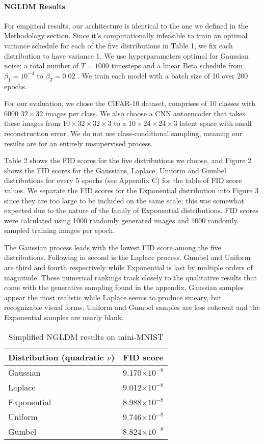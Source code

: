 \documentclass[10pt,twocolumn,letterpaper]{article}
\begin{document}
\paragraph{\textbf{NGLDM Results}} For empirical results, our architecture is identical to the one we defined in the Methodology section. Since it's computationally infeasible to train an optimal variance schedule for each of the five distributions in Table 1, we fix each distribution to have variance 1. We use hyperparameters optimal for Gaussian noise: a total number of $T=1000$ timesteps and a linear Beta schedule from $\beta_1=10^{-4}$ to $\beta_T=0.02$ \cite{DBLP:journals/corr/abs-2006-11239}. We train each model with a batch size of 10 over 200 epochs.

For our evaluation, we chose the CIFAR-10 dataset, comprises of 10 classes with 6000 $32\times 32$ images per class. We also choose a CNN autoencoder that takes these images from $10\times 32\times 32\times 3$ to a $10\times 24\times 24\times 3$ latent space with small reconstruction error. We do not use class-conditional sampling, meaning our results are for an entirely unsupervised process.

Table 2 shows the FID scores for the five distributions we choose, and Figure 2 shows the FID scores for the Gaussians, Laplace, Uniform and Gumbel distributions for every 5 epochs (see Appendix C) for the table of FID score values. We separate the FID scores for the Exponential distribution into Figure 3 since they are too large to be included on the same scale; this was somewhat expected due to the nature of the family of Exponential distributions. FID scores were calculated using 1000 randomly generated images and 1000 randomly sampled training images per epoch.

The Gaussian process leads with the lowest FID score among the five distributions. Following in second is the Laplace process. Gumbel and Uniform are third and fourth respectively while Exponential is last by multiple orders of magnitude. These numerical rankings track closely to the qualitative results that come with the generative sampling found in the appendix. Gaussian samples appear the most realistic while Laplace seems to produce smeary, but recognizable visual forms. Uniform and Gumbel samples are less coherent and the Exponential samples are nearly blank.  


\begin{table}
  \centering
  \begin{tabular}{@{}lc@{}}
    \toprule
    Distribution (quadratic $\nu$) & FID score \\
    \midrule
    Gaussian & 9.170$\times 10^{-8}$ \\
    Laplace & 9.012$\times 10^{-8}$ \\
    Exponential & 8.988$\times 10^{-8}$ \\
    Uniform & 9.746$\times 10^{-8}$ \\
    Gumbel & 8.824$\times 10^{-8}$ \\
    \bottomrule
  \end{tabular}
  \caption{Simplified NGLDM results on mini-MNIST}
  \label{tab:example}
\end{table}
\end{document}
